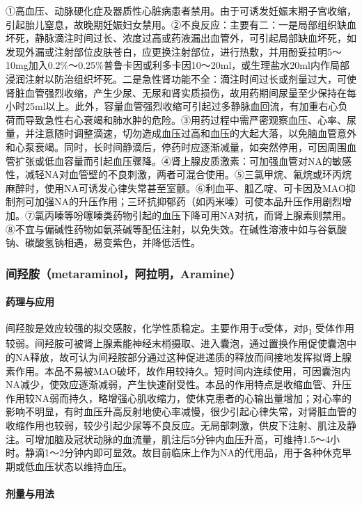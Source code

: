 ①高血压、动脉硬化症及器质性心脏病患者禁用。由于可诱发妊娠末期子宫收缩，引起胎儿窒息，故晚期妊娠妇女禁用。②不良反应：主要有二：一是局部组织缺血坏死，静脉滴注时间过长、浓度过高或药液漏出血管外，可引起局部缺血坏死，如发现外漏或注射部位皮肤苍白，应更换注射部位，进行热敷，并用酚妥拉明5～10mg加入0.2\%～0.25\%普鲁卡因或利多卡因10～20ml，或生理盐水20ml内作局部浸润注射以防治组织坏死。二是急性肾功能不全：滴注时间过长或剂量过大，可使肾脏血管强烈收缩，产生少尿、无尿和肾实质损伤，故用药期间尿量至少保持在每小时25ml以上。此外，容量血管强烈收缩可引起过多静脉血回流，有加重右心负荷而导致急性右心衰竭和肺水肿的危险。③用药过程中需严密观察血压、心率、尿量，并注意随时调整滴速，切勿造成血压过高和血压的大起大落，以免脑血管意外和心泵衰竭。同时，长时间静滴后，停药时应逐渐减量，如突然停用，可因周围血管扩张或低血容量而引起血压骤降。④肾上腺皮质激素：可加强血管对NA的敏感性，减轻NA对血管壁的不良刺激，两者可混合使用。⑤三氯甲烷、氟烷或环丙烷麻醉时，使用NA可诱发心律失常甚至室颤。⑥利血平、胍乙啶、可卡因及MAO抑制剂可加强NA的升压作用；三环抗抑郁药（如丙米嗪）可使本品升压作用剧烈增加。⑦氯丙嗪等吩噻嗪类药物引起的血压下降可用NA对抗，而肾上腺素则禁用。⑧不宜与偏碱性药物如氨茶碱等配伍注射，以免失效。在碱性溶液中如与谷氨酸钠、碳酸氢钠相遇，易变紫色，并降低活性。

\subsubsection{间羟胺（metaraminol，阿拉明，Aramine）}

\paragraph{药理与应用}

间羟胺是效应较强的拟交感胺，化学性质稳定。主要作用于α受体，对β\textsubscript{1}
受体作用较弱。间羟胺可被肾上腺素能神经末梢摄取、进入囊泡，通过置换作用促使囊泡中的NA释放，故可认为间羟胺部分通过这种促进递质的释放而间接地发挥拟肾上腺素作用。本品不易被MAO破坏，故作用较持久。短时间内连续使用，可因囊泡内NA减少，使效应逐渐减弱，产生快速耐受性。本品的作用特点是收缩血管、升压作用较NA弱而持久，略增强心肌收缩力，使休克患者的心输出量增加；对心率的影响不明显，有时血压升高反射地使心率减慢，很少引起心律失常，对肾脏血管的收缩作用也较弱，较少引起少尿等不良反应。无局部刺激，供皮下注射、肌注及静注。可增加脑及冠状动脉的血流量，肌注后5分钟内血压升高，可维持1.5～4小时。静滴1～2分钟内即可显效。故目前临床上作为NA的代用品，用于各种休克早期或低血压状态以维持血压。

\paragraph{剂量与用法}

